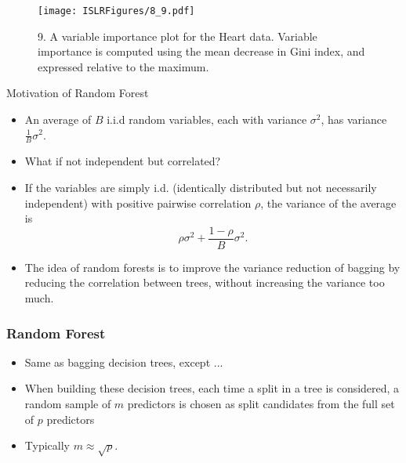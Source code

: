 \documentclass{beamer}
\begin{document}
                
                   \begin{frame}
                   	\frametitle{ }
                   	\begin{figure}
                   		\centering
                   		
                   		\centering
                   		\texttt{[image: ISLRFigures/8\_9.pdf]}
                   		\caption{\scriptsize 9. A variable importance plot for the Heart data. Variable importance
                   			is computed using the mean decrease in Gini index, and expressed relative
                   			to the maximum.
                   		}
                   	\end{figure}
                   \end{frame}
                     
                     \begin{frame}{Motivation of Random Forest}
                     \begin{itemize}
                     \item An average of $B$ i.i.d random variables, each with variance $\sigma^2$, has variance $\frac{1}{B}\sigma^2$.
                     \item What if not independent but correlated?
                     \item If the variables are simply i.d. (identically distributed but not necessarily independent) with positive pairwise correlation $\rho$, the variance of the average is $$\rho \sigma^2 +\frac{1-\rho}{B}\sigma^2.$$
                     \item The idea of random forests is to improve the variance reduction of bagging by reducing the correlation between trees, without increasing the variance too much.
                   \end{itemize}
                     \end{frame}
                    
                    \begin{frame}
                    	\frametitle{Random Forest  }
                    	\begin{itemize}
                    		\item Same as bagging decision trees, except  ...
                    		\item When building these
                    		decision trees, each time a split in a tree is considered, a random sample of
                    		$m$ predictors is chosen as split candidates from the full set of $p$ predictors
                    		\item  Typically $ m \approx \sqrt{p}$.
                    		 
                    		
                    	\end{itemize}
                    \end{frame} 
                    
\end{document}
